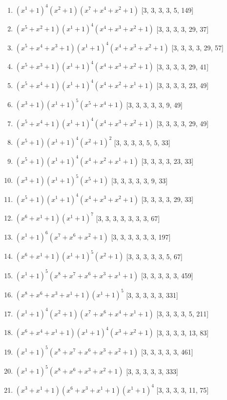 \documentclass[10pt,twocolumn]{article}
\begin{document}
\begin{enumerate}
\item $(x^{1} + 1)^{4}(x^{2} + 1)(x^{7} + x^{4} + x^{2} + 1)$  [3, 3, 3, 3, 5, 149]
\item $(x^{5} + x^{2} + 1)(x^{1} + 1)^{4}(x^{4} + x^{3} + x^{2} + 1)$  [3, 3, 3, 3, 29, 37]
\item $(x^{5} + x^{4} + x^{3} + 1)(x^{1} + 1)^{4}(x^{4} + x^{3} + x^{2} + 1)$  [3, 3, 3, 3, 29, 57]
\item $(x^{5} + x^{3} + 1)(x^{1} + 1)^{4}(x^{4} + x^{3} + x^{2} + 1)$  [3, 3, 3, 3, 29, 41]
\item $(x^{5} + x^{4} + 1)(x^{1} + 1)^{4}(x^{4} + x^{2} + x^{1} + 1)$  [3, 3, 3, 3, 23, 49]
\item $(x^{3} + 1)(x^{1} + 1)^{5}(x^{5} + x^{4} + 1)$  [3, 3, 3, 3, 3, 9, 49]
\item $(x^{5} + x^{4} + 1)(x^{1} + 1)^{4}(x^{4} + x^{3} + x^{2} + 1)$  [3, 3, 3, 3, 29, 49]
\item $(x^{5} + 1)(x^{1} + 1)^{4}(x^{2} + 1)^{2}$  [3, 3, 3, 3, 5, 5, 33]
\item $(x^{5} + 1)(x^{1} + 1)^{4}(x^{4} + x^{2} + x^{1} + 1)$  [3, 3, 3, 3, 23, 33]
\item $(x^{3} + 1)(x^{1} + 1)^{5}(x^{5} + 1)$  [3, 3, 3, 3, 3, 9, 33]
\item $(x^{5} + 1)(x^{1} + 1)^{4}(x^{4} + x^{3} + x^{2} + 1)$  [3, 3, 3, 3, 29, 33]
\item $(x^{6} + x^{1} + 1)(x^{1} + 1)^{7}$  [3, 3, 3, 3, 3, 3, 3, 67]
\item $(x^{1} + 1)^{6}(x^{7} + x^{6} + x^{2} + 1)$  [3, 3, 3, 3, 3, 3, 197]
\item $(x^{6} + x^{1} + 1)(x^{1} + 1)^{5}(x^{2} + 1)$  [3, 3, 3, 3, 3, 5, 67]
\item $(x^{1} + 1)^{5}(x^{8} + x^{7} + x^{6} + x^{3} + x^{1} + 1)$  [3, 3, 3, 3, 3, 459]
\item $(x^{8} + x^{6} + x^{3} + x^{1} + 1)(x^{1} + 1)^{5}$  [3, 3, 3, 3, 3, 331]
\item $(x^{1} + 1)^{4}(x^{2} + 1)(x^{7} + x^{6} + x^{4} + x^{1} + 1)$  [3, 3, 3, 3, 5, 211]
\item $(x^{6} + x^{4} + x^{1} + 1)(x^{1} + 1)^{4}(x^{3} + x^{2} + 1)$  [3, 3, 3, 3, 13, 83]
\item $(x^{1} + 1)^{5}(x^{8} + x^{7} + x^{6} + x^{3} + x^{2} + 1)$  [3, 3, 3, 3, 3, 461]
\item $(x^{1} + 1)^{5}(x^{8} + x^{6} + x^{3} + x^{2} + 1)$  [3, 3, 3, 3, 3, 333]
\item $(x^{3} + x^{1} + 1)(x^{6} + x^{3} + x^{1} + 1)(x^{1} + 1)^{4}$  [3, 3, 3, 3, 11, 75]

\end{enumerate}
\end{document}
